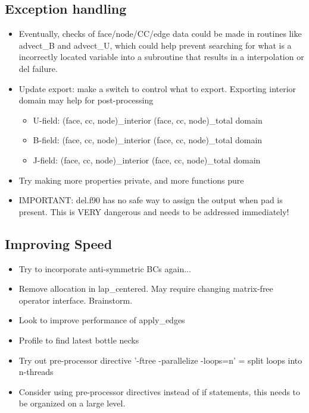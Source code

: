 \documentclass[11pt]{article}
\begin{document}
\subsection{Exception handling}
\begin{itemize}
\setlength\itemsep{-1em}
\item Eventually, checks of face/node/CC/edge data could be made in routines like advect\_B and advect\_U, which could help prevent searching for what is a incorrectly located variable into a subroutine that results in a interpolation or del failure.
\item Update export: make a switch to control what to export. Exporting interior domain may help for post-processing
\begin{itemize}
\setlength\itemsep{-1em}
\item U-field: (face, cc, node)\_interior (face, cc, node)\_total domain
\item B-field: (face, cc, node)\_interior (face, cc, node)\_total domain
\item J-field: (face, cc, node)\_interior (face, cc, node)\_total domain
\end{itemize}
\item Try making more properties private, and more functions pure
\item IMPORTANT: del.f90 has no safe way to assign the output when pad is present. This is VERY dangerous and needs to be addressed immediately!
\end{itemize}

\subsection{Improving Speed}
\begin{itemize}
\setlength\itemsep{-1em}
\item Try to incorporate anti-symmetric BCs again...
\item Remove allocation in lap\_centered. May require changing matrix-free operator interface. Brainstorm.
\item Look to improve performance of apply\_edges
\item Profile to find latest bottle necks
\item Try out pre-processor directive '-ftree -parallelize -loops=n' = split loops into n-threads
\item Consider using pre-processor directives instead of if statements, this needs to be organized on a large level.
\end{itemize}
\end{document}
